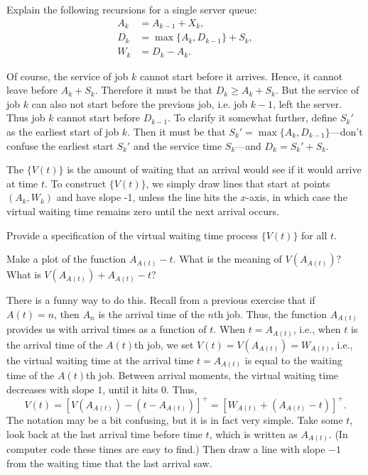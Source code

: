 \begin{exercise} 
Explain the following recursions for a single server queue: 
\begin{equation}
 \label{eq:45}
 \begin{split}
 A_k &= A_{k-1} + X_k, \\
 D_k &= \max\{A_k, D_{k-1}\} + S_k,\\
 W_k &= D_k - A_k.
 \end{split}
\end{equation}

\begin{solution}
 Of course, the service of job $k$ cannot start before it arrives.
 Hence, it cannot leave before $A_k + S_k$.
 Therefore it must be that $D_k \geq A_k +S_k$.
 But the service of job $k$ can also not start before the previous job, i.e.
 job $k-1$, left the server.
 Thus job $k$ cannot start before $D_{k-1}$.
 To clarify it somewhat further, define $S_k'$ as the earliest start of job $k$.
 Then it must be that $S_k' = \max\{A_k, D_{k-1}\}$---don't confuse the earliest start $S_k'$ and the service time $S_k$---and $D_k = S_k' + S_k$.
\end{solution}
\end{exercise}

The  $\{V(t)\}$ is the amount of waiting that an arrival would see if it would arrive at time $t$.
To construct $\{V(t)\}$, we simply draw lines that start at points $(A_k, W_k)$ and have slope -1, unless the line hits the $x$-axis, in which case the virtual waiting time remains zero until the next arrival occurs.


\begin{exercise}
 Provide a specification of the virtual waiting time process $\{V(t)\}$ for
 all $t$.
\begin{hint}Make a plot of the function $A_{A(t)}-t$. What is the meaning of $V(A_{A(t)})?$ What is
$V(A_{A(t)}) + A_{A(t)}-t$?
\end{hint}
\begin{solution}
 There is a funny way to do this.
 Recall from a previous exercise that if $A(t)=n$, then $A_n$ is the arrival time of the $n$th job.
 Thus, the function $A_{A(t)}$ provides us with arrival times as a function of $t$.
 When $t=A_{A(t)}$, i.e., when $t$ is the arrival time of the $A(t)$th job, we set $V(t) = V(A_{A(t)}) = W_{A(t)}$, i.e., the virtual waiting time at the arrival time $t=A_{A(t)}$ is equal to the waiting time of the $A(t)$th job.
 Between arrival moments, the virtual waiting time decreases with slope $1$, until it hits 0.
 Thus,
 \begin{equation*}
 V(t) 
= [V(A_{A(t)}) - (t-A_{A(t)})]^+= [W_{A(t)} + (A_{A(t)}-t)]^+.
 \end{equation*}
 The notation may be a bit confusing, but it is in fact very simple.
 Take some $t$, look back at the last arrival time before time $t$, which is written as $A_{A(t)}$.
 (In computer code these times are easy to find.)
 Then draw a line with slope $-1$ from the waiting time that the last arrival saw.
\end{solution}
\end{exercise}


